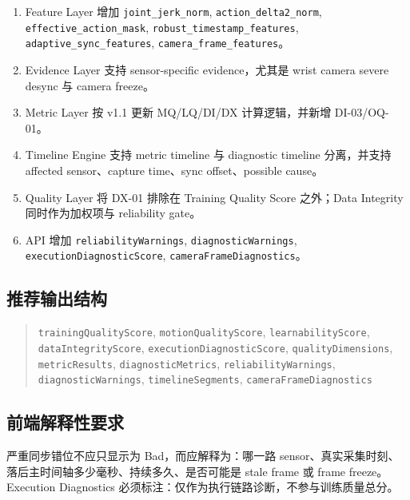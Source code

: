 \documentclass[UTF8,zihao=-4]{ctexart}
\newcommand{\Code}[1]{\texttt{#1}}
\begin{document}
\begin{enumerate}
\item Feature Layer 增加 \Code{joint\_jerk\_norm}, \Code{action\_delta2\_norm}, \Code{effective\_action\_mask}, \Code{robust\_timestamp\_features}, \Code{adaptive\_sync\_features}, \Code{camera\_frame\_features}。
\item Evidence Layer 支持 sensor-specific evidence，尤其是 wrist camera severe desync 与 camera freeze。
\item Metric Layer 按 v1.1 更新 MQ/LQ/DI/DX 计算逻辑，并新增 DI-03/OQ-01。
\item Timeline Engine 支持 metric timeline 与 diagnostic timeline 分离，并支持 affected sensor、capture time、sync offset、possible cause。
\item Quality Layer 将 DX-01 排除在 Training Quality Score 之外；Data Integrity 同时作为加权项与 reliability gate。
\item API 增加 \Code{reliabilityWarnings}, \Code{diagnosticWarnings}, \Code{executionDiagnosticScore}, \Code{cameraFrameDiagnostics}。
\end{enumerate}

\subsection*{推荐输出结构}

\begin{quote}\small
\Code{trainingQualityScore}, \Code{motionQualityScore}, \Code{learnabilityScore}, \Code{dataIntegrityScore}, \Code{executionDiagnosticScore}, \Code{qualityDimensions}, \Code{metricResults}, \Code{diagnosticMetrics}, \Code{reliabilityWarnings}, \Code{diagnosticWarnings}, \Code{timelineSegments}, \Code{cameraFrameDiagnostics}
\end{quote}

\subsection*{前端解释性要求}

严重同步错位不应只显示为 Bad，而应解释为：哪一路 sensor、真实采集时刻、落后主时间轴多少毫秒、持续多久、是否可能是 stale frame 或 frame freeze。Execution Diagnostics 必须标注：仅作为执行链路诊断，不参与训练质量总分。
\end{document}
